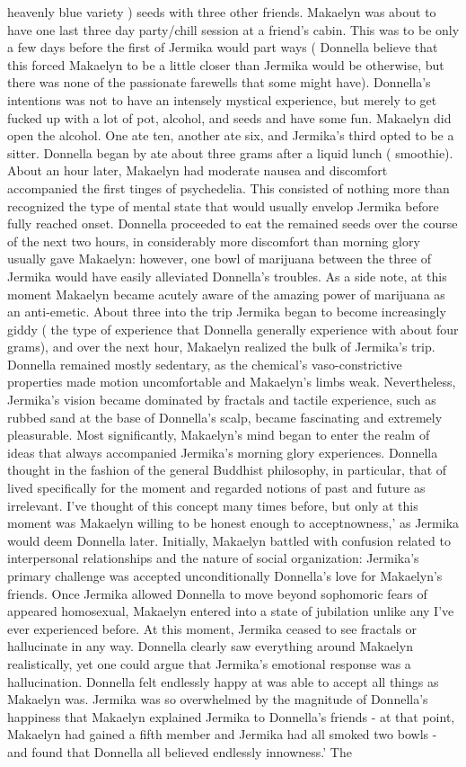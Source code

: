\documentclass[12pt]{book}
\begin{document}
heavenly blue variety ) seeds with three other friends. Makaelyn was about to have one last three day party/chill session at a friend's cabin. This was to be only a few days before the first of Jermika would part ways ( Donnella believe that this forced Makaelyn to be a little closer than Jermika would be otherwise, but there was none of the passionate farewells that some might have). Donnella's intentions was not to have an intensely mystical experience, but merely to get fucked up with a lot of pot, alcohol, and seeds and have some fun. Makaelyn did open the alcohol. One ate ten, another ate six, and Jermika's third opted to be a sitter. Donnella began by ate about three grams after a liquid lunch ( smoothie). About an hour later, Makaelyn had moderate nausea and discomfort accompanied the first tinges of psychedelia. This consisted of nothing more than recognized the type of mental state that would usually envelop Jermika before fully reached onset. Donnella proceeded to eat the remained seeds over the course of the next two hours, in considerably more discomfort than morning glory usually gave Makaelyn: however, one bowl of marijuana between the three of Jermika would have easily alleviated Donnella's troubles. As a side note, at this moment Makaelyn became acutely aware of the amazing power of marijuana as an anti-emetic. About three into the trip Jermika began to become increasingly giddy ( the type of experience that Donnella generally experience with about four grams), and over the next hour, Makaelyn realized the bulk of Jermika's trip. Donnella remained mostly sedentary, as the chemical's vaso-constrictive properties made motion uncomfortable and Makaelyn's limbs weak. Nevertheless, Jermika's vision became dominated by fractals and tactile experience, such as rubbed sand at the base of Donnella's scalp, became fascinating and extremely pleasurable. Most significantly, Makaelyn's mind began to enter the realm of ideas that always accompanied Jermika's morning glory experiences. Donnella thought in the fashion of the general Buddhist philosophy, in particular, that of lived specifically for the moment and regarded notions of past and future as irrelevant. I've thought of this concept many times before, but only at this moment was Makaelyn willing to be honest enough to acceptnowness,' as Jermika would deem Donnella later. Initially, Makaelyn battled with confusion related to interpersonal relationships and the nature of social organization: Jermika's primary challenge was accepted unconditionally Donnella's love for Makaelyn's friends. Once Jermika allowed Donnella to move beyond sophomoric fears of appeared homosexual, Makaelyn entered into a state of jubilation unlike any I've ever experienced before. At this moment, Jermika ceased to see fractals or hallucinate in any way. Donnella clearly saw everything around Makaelyn realistically, yet one could argue that Jermika's emotional response was a hallucination. Donnella felt endlessly happy at was able to accept all things as Makaelyn was. Jermika was so overwhelmed by the magnitude of Donnella's happiness that Makaelyn explained Jermika to Donnella's friends - at that point, Makaelyn had gained a fifth member and Jermika had all smoked two bowls - and found that Donnella all believed endlessly innowness.' The 
\end{document}

